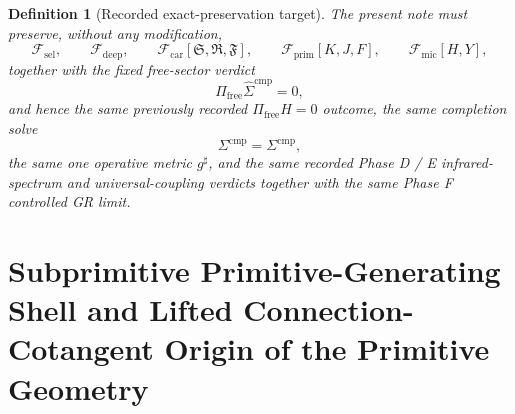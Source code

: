 \documentclass[11pt]{article}
\newcommand{\CompletedMetric}{g^{\sharp}}
\newcommand{\CompShift}{\Sigma^{\mathrm{cmp}}}
\newcommand{\CompLift}{\widehat\Sigma^{\mathrm{cmp}}}
\newcommand{\FreeProj}{\Pi_{\mathrm{free}}}
\newcommand{\GaugeAux}{Y}
\newcommand{\MicFunctional}{\mathscr F_{\mathrm{mic}}}
\newcommand{\PrimFunctional}{\mathscr F_{\mathrm{prim}}}
\newcommand{\CarrierFunctional}{\mathscr F_{\mathrm{car}}}
\newcommand{\DeepFunctional}{\mathscr F_{\mathrm{deep}}}
\newcommand{\StemFunctional}{\mathscr F_{\mathrm{sel}}}
\newcommand{\PrimStrain}{K}
\newcommand{\PrimNeutral}{J}
\newcommand{\PrimFree}{F}
\newcommand{\CarrierSeed}{\mathfrak S}
\newcommand{\RelabelSeed}{\mathfrak R}
\newcommand{\FreeSeed}{\mathfrak F}
\newtheorem{definition}{Definition}
\begin{document}
\begin{definition}[Recorded exact-preservation target]
\label{def:recorded_target}
The present note must preserve, without any modification,
\begin{equation}
\StemFunctional,
\qquad
\DeepFunctional,
\qquad
\CarrierFunctional[\CarrierSeed,\RelabelSeed,\FreeSeed],
\qquad
\PrimFunctional[\PrimStrain,\PrimNeutral,\PrimFree],
\qquad
\MicFunctional[H,\GaugeAux],
\label{eq:target_functionals}
\end{equation}
together with the fixed free-sector verdict
\begin{equation}
\FreeProj\CompLift=0,
\label{eq:target_free}
\end{equation}
and hence the same previously recorded \(\Pi_{\mathrm{free}}H=0\) outcome, the same completion solve
\begin{equation}
\CompShift=\Sigma^{\mathrm{cmp}},
\label{eq:target_sigma}
\end{equation}
the same one operative metric \(\CompletedMetric\), and the same recorded Phase D / E infrared-spectrum and universal-coupling verdicts together with the same Phase F controlled GR limit.
\end{definition}

\section{Subprimitive Primitive-Generating Shell and Lifted Connection-Cotangent Origin of the Primitive Geometry}
\end{document}
